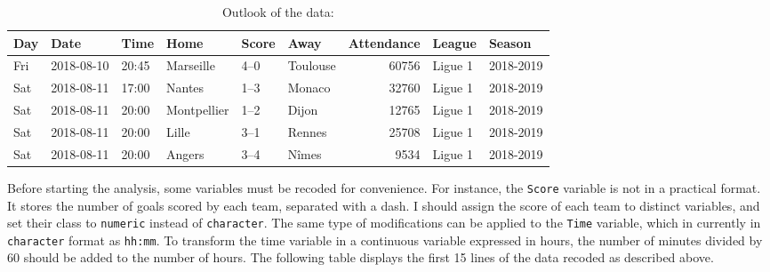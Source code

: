 \documentclass[
]{article}
\newenvironment{Shaded}{\begin{snugshade}}{\end{snugshade}}
\newcommand{\CommentTok}[1]{\textcolor[rgb]{0.56,0.35,0.01}{\textit{#1}}}
\newcommand{\DataTypeTok}[1]{\textcolor[rgb]{0.13,0.29,0.53}{#1}}
\newcommand{\DecValTok}[1]{\textcolor[rgb]{0.00,0.00,0.81}{#1}}
\newcommand{\KeywordTok}[1]{\textcolor[rgb]{0.13,0.29,0.53}{\textbf{#1}}}
\newcommand{\NormalTok}[1]{#1}
\newcommand{\OperatorTok}[1]{\textcolor[rgb]{0.81,0.36,0.00}{\textbf{#1}}}
\newcommand{\StringTok}[1]{\textcolor[rgb]{0.31,0.60,0.02}{#1}}
\begin{document}
\begin{Shaded}
\end{Shaded}

\begin{table}

\caption{\label{tab:unnamed-chunk-2}Outlook of the data:}
\centering
\begin{tabular}[t]{llllllrll}
\toprule
Day & Date & Time & Home & Score & Away & Attendance & League & Season\\
\midrule
Fri & 2018-08-10 & 20:45 & Marseille & 4–0 & Toulouse & 60756 & Ligue 1 & 2018-2019\\
Sat & 2018-08-11 & 17:00 & Nantes & 1–3 & Monaco & 32760 & Ligue 1 & 2018-2019\\
Sat & 2018-08-11 & 20:00 & Montpellier & 1–2 & Dijon & 12765 & Ligue 1 & 2018-2019\\
Sat & 2018-08-11 & 20:00 & Lille & 3–1 & Rennes & 25708 & Ligue 1 & 2018-2019\\
Sat & 2018-08-11 & 20:00 & Angers & 3–4 & Nîmes & 9534 & Ligue 1 & 2018-2019\\
\bottomrule
\end{tabular}
\end{table}

Before starting the analysis, some variables must be recoded for
convenience. For instance, the \texttt{Score} variable is not in a
practical format. It stores the number of goals scored by each team,
separated with a dash. I should assign the score of each team to
distinct variables, and set their class to \texttt{numeric} instead of
\texttt{character}. The same type of modifications can be applied to the
\texttt{Time} variable, which in currently in \texttt{character} format
as \texttt{hh:mm}. To transform the time variable in a continuous
variable expressed in hours, the number of minutes divided by 60 should
be added to the number of hours. The following table displays the first
15 lines of the data recoded as described above.
\end{document}
